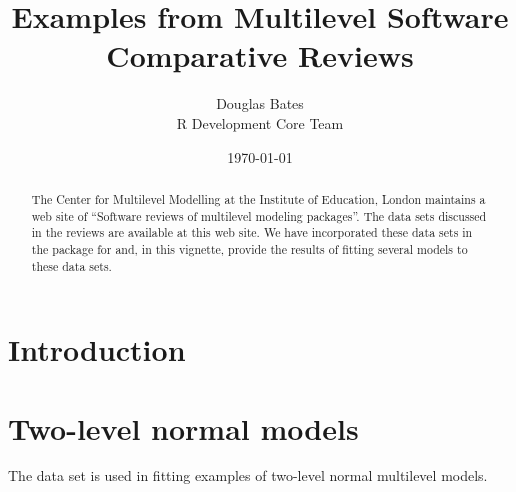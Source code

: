 \documentclass[12pt]{article}
\begin{document}
\title{Examples from Multilevel Software Comparative Reviews}
\author{Douglas Bates\\R Development Core Team\\}
\date{\today}
\maketitle
\begin{abstract}
   The Center for Multilevel Modelling at the Institute of Education,
   London maintains a web site of ``Software reviews of multilevel
   modeling packages''.  The data sets discussed in the reviews are
   available at this web site.  We have incorporated these data sets
   in the  package for \RR{} and, in this vignette, provide
   the results of fitting several models to these data sets.
\end{abstract}

\section{Introduction}
\label{sec:Intro}


\section{Two-level normal models}
\label{sec:TwoLevelNormal}



The  data set is used in fitting examples of two-level
normal multilevel models.
\end{document}
